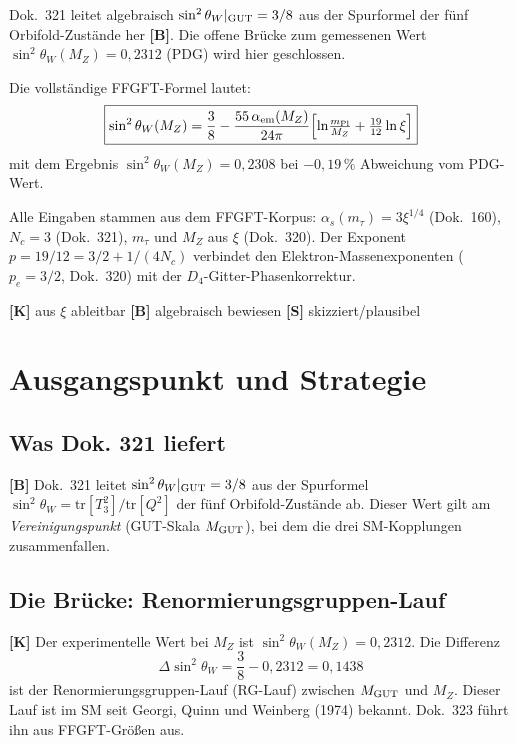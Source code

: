 Dok.~321 leitet algebraisch $\sin^2\theta_W|_{\rm GUT} = 3/8$ aus
der Spurformel der fünf Orbifold-Zustände her \textbf{[B]}. Die
offene Brücke zum gemessenen Wert $\sin^2\theta_W(M_Z) = 0{,}2312$
(PDG) wird hier geschlossen.

Die vollständige FFGFT-Formel lautet:
\begin{equation}
  \boxed{\sin^2\theta_W(M_Z)
  = \frac{3}{8}
  - \frac{55\,\alpha_{\rm em}(M_Z)}{24\pi}
    \Bigl[\ln\!\tfrac{m_{\rm Pl}}{M_Z}
         + \tfrac{19}{12}\ln\xi\Bigr]}
  \label{eq:main}
\end{equation}
mit dem Ergebnis $\sin^2\theta_W(M_Z) = 0{,}2308$ bei
$-0{,}19\,\%$ Abweichung vom PDG-Wert.

Alle Eingaben stammen aus dem FFGFT-Korpus: $\alpha_s(m_\tau) =
3\xi^{1/4}$ (Dok.~160), $N_c = 3$ (Dok.~321), $m_\tau$ und $M_Z$
aus $\xi$ (Dok.~320). Der Exponent $p = 19/12 = 3/2 + 1/(4N_c)$
verbindet den Elektron-Massenexponenten ($p_e = 3/2$, Dok.~320) mit
der $D_4$-Gitter-Phasenkorrektur.

\begin{keyresult}[Statusmarkierung]
\textbf{[K]} aus $\xi$ ableitbar \quad
\textbf{[B]} algebraisch bewiesen \quad
\textbf{[S]} skizziert/plausibel
\end{keyresult}

\section{Ausgangspunkt und Strategie}

\subsection{Was Dok. 321 liefert}

\textbf{[B]} Dok.~321 leitet $\sin^2\theta_W|_{\rm GUT} = 3/8$ aus
der Spurformel $\sin^2\theta_W = \mathrm{tr}[T_3^2]/\mathrm{tr}[Q^2]$
der fünf Orbifold-Zustände ab. Dieser Wert gilt am
\emph{Vereinigungspunkt} (GUT-Skala $M_{\rm GUT}$), bei dem die drei
SM-Kopplungen zusammenfallen.

\subsection{Die Brücke: Renormierungsgruppen-Lauf}

\textbf{[K]} Der experimentelle Wert bei $M_Z$ ist
$\sin^2\theta_W(M_Z) = 0{,}2312$. Die Differenz
\begin{equation}
  \Delta\sin^2\theta_W
  = \frac{3}{8} - 0{,}2312 = 0{,}1438
  \label{eq:delta}
\end{equation}
ist der Renormierungsgruppen-Lauf (RG-Lauf) zwischen $M_{\rm GUT}$
und $M_Z$. Dieser Lauf ist im SM seit Georgi, Quinn und Weinberg (1974)
bekannt. Dok.~323 führt ihn aus FFGFT-Größen aus.

